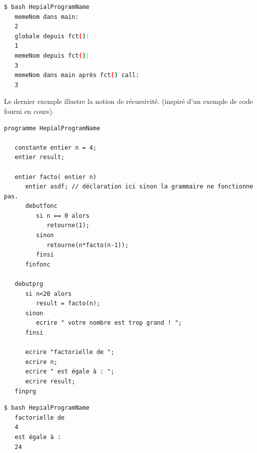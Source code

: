 \documentclass[11pt,a4paper]{article}
\begin{document}
   \begin{lstlisting}[language=bash,caption={Résultat du test de la notion de portée}]
   $ bash HepialProgramName
   memeNom dans main:
   2
   globale depuis fct():
   1
   memeNom depuis fct():
   3
   memeNom dans main après fct() call:
   3
   \end{lstlisting} 
   
  \newpage
  \par Le dernier exemple illustre la notion de récursivité. (inspiré d'un exemple de code fourni en cours). 
  
   \begin{lstlisting}[caption={Code Hepial pour tester la récursivité}]
   programme HepialProgramName
   
   constante entier n = 4;
   entier result;
   
   entier facto( entier n)
      entier asdf; // déclaration ici sinon la grammaire ne fonctionne pas. 
      debutfonc
         si n == 0 alors
            retourne(1);
         sinon 
            retourne(n*facto(n-1));
         finsi
      finfonc
   
   debutprg
      si n<20 alors
         result = facto(n);
      sinon
         ecrire " votre nombre est trop grand ! ";
      finsi
   
      ecrire "factorielle de ";
      ecrire n;
      ecrire " est égale à : ";
      ecrire result; 
   finprg
   \end{lstlisting} 
   
   \begin{lstlisting}[language=bash,caption={Résultat du test de la récursivité}]
   $ bash HepialProgramName
   factorielle de 
   4
   est égale à : 
   24
   \end{lstlisting} 
   
\end{document}
